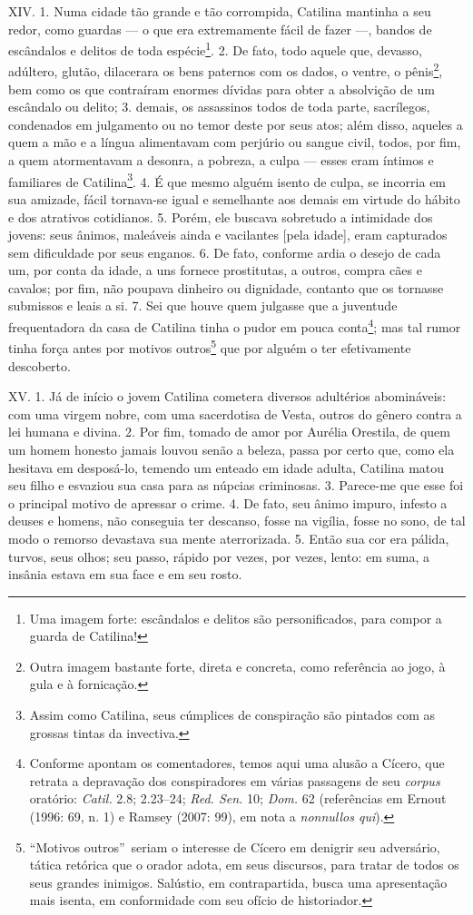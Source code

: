 XIV. 1. Numa cidade tão grande e tão corrompida, Catilina mantinha a seu redor,
como guardas --- o que era extremamente fácil de fazer ---, bandos de
escândalos e delitos de toda espécie\footnote{Uma imagem forte: escândalos e
delitos são personificados, para compor a guarda de Catilina!}. 2. De fato,
todo aquele que, devasso, adúltero, glutão, dilacerara os bens paternos com os
dados, o ventre, o pênis\footnote{Outra imagem bastante forte, direta e
concreta, como referência ao jogo, à gula e à fornicação.}, bem como os que contraíram enormes dívidas para obter a absolvição
de um escândalo ou delito; 3. demais, os assassinos todos de toda parte,
sacrílegos, condenados em julgamento ou no temor deste por seus atos; além
disso, aqueles a quem a mão e a língua alimentavam com perjúrio ou sangue
civil, todos, por fim, a quem atormentavam a desonra, a pobreza, a culpa ---
esses eram íntimos e familiares de Catilina\footnote{Assim como Catilina, seus
cúmplices de conspiração são pintados com as grossas tintas da invectiva.}. 4.
É que mesmo alguém isento de culpa, se incorria em sua amizade, fácil
tornava-se igual e semelhante aos demais em virtude do hábito e dos atrativos
cotidianos. 5. Porém, ele buscava sobretudo a intimidade dos jovens: seus
ânimos, maleáveis ainda e vacilantes [pela idade], eram capturados sem
dificuldade por seus enganos. 6. De fato, conforme ardia o desejo de cada um, 
por conta da idade, a uns fornece prostitutas, a outros, compra cães e cavalos; por
fim, não poupava dinheiro ou dignidade, contanto que os tornasse submissos e
leais a si. 7. Sei que houve quem julgasse que a juventude frequentadora da
casa de Catilina tinha o pudor em pouca conta\footnote{Conforme apontam os
comentadores, temos aqui uma alusão a Cícero, que retrata a depravação dos
conspiradores em várias passagens de seu \emph{corpus} oratório:
\emph{Catil.} 2.8; 2.23--24; \emph{Red. Sen.} 10; \emph{Dom.} 62 (referências em Ernout
(1996: 69, n. 1) e Ramsey (2007: 99), em nota a \emph{nonnullos qui}).};
mas tal rumor tinha força antes por motivos outros\footnote{``Motivos outros''\
seriam o interesse de Cícero em denigrir seu adversário, tática retórica que o
orador adota, em seus discursos, para tratar de todos os seus grandes inimigos. Salústio, em contrapartida, busca uma apresentação mais isenta, em conformidade com seu ofício de historiador.} que por
alguém o ter efetivamente descoberto.

XV. 1. Já de início o jovem Catilina cometera diversos adultérios abomináveis:
com uma virgem nobre, com uma sacerdotisa de Vesta, outros do gênero contra a
lei humana e divina. 2. Por fim, tomado de amor por Aurélia Orestila, de quem
um homem honesto jamais louvou senão a beleza, passa por certo que, como
ela hesitava em desposá-lo, temendo um enteado em idade adulta, Catilina matou
seu filho e esvaziou sua casa para as núpcias criminosas. 3. Parece-me que esse
foi o principal motivo de apressar o crime. 4. De fato, seu ânimo impuro,
infesto a deuses e homens, não conseguia ter descanso, fosse na vigília, fosse
no sono, de tal modo o remorso devastava sua mente aterrorizada. 5. Então sua
cor era pálida, turvos, seus olhos; seu passo, rápido por vezes, por vezes,
lento: em suma, a insânia estava em sua face e em seu rosto. 

